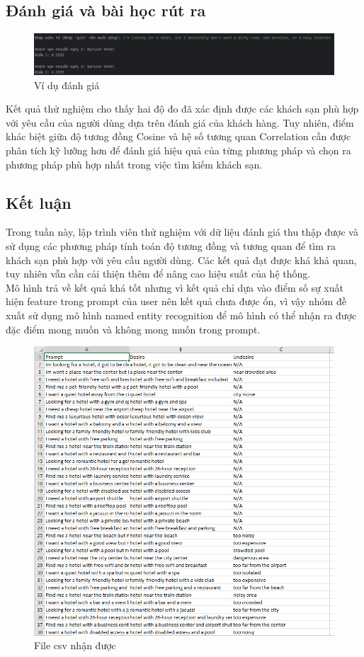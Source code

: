 \subsection{Đánh giá và bài học rút ra}

\begin{figure}[H]
    \centering
    \includegraphics[width=1.0\linewidth]{Figures/Result_cosine_corr.png}
    \caption{Ví dụ đánh giá }
    \label{fig:enter-label}
\end{figure}
Kết quả thử nghiệm cho thấy hai độ đo đã xác định được các khách sạn phù hợp với yêu cầu của người dùng dựa trên đánh giá của khách hàng. Tuy nhiên, điểm khác biệt giữa độ tương đồng Cosine và hệ số tương quan Correlation cần được phân tích kỹ lưỡng hơn để đánh giá hiệu quả của từng phương pháp và chọn ra phương pháp phù hợp nhất trong việc tìm kiếm khách sạn.

\subsection{Kết luận}
Trong tuần này, lập trình viên thử nghiệm với dữ liệu đánh giá thu thập được và sử dụng các phương pháp tính toán độ tương đồng và tương quan để tìm ra khách sạn phù hợp với yêu cầu người dùng. Các kết quả đạt được khá khả quan, tuy nhiên vẫn cần cải thiện thêm để nâng cao hiệu suất của hệ thống.\\
Mô hình trả về kết quả khá tốt nhưng vì kết quả chỉ dựa vào điểm số sự xuất hiện feature trong prompt của user nên kết quả chưa được ổn, vì vậy nhóm đề xuất sử dụng mô hình named entity recognition để mô hình có thể nhận ra được đặc điểm mong muốn và không mong muốn trong prompt.

\begin{figure}[H]
    \centering
    \includegraphics[width=0.9\linewidth]{Figures/prompt_csv.png}
    \caption{File csv nhận được}
    \label{fig:enter-label}
\end{figure}

